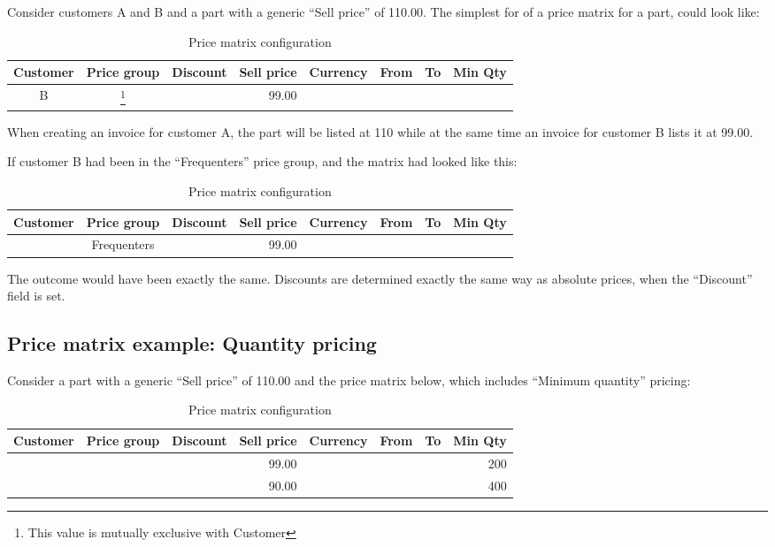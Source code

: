 Consider customers A and B and a part with a generic ``Sell price'' of 110.00.
The simplest for of a price matrix for a part, could look like:

\begin{table}[H]
		\caption{Price matrix configuration}
\begin{tabular}{|ccrrcrrr|}
	\hline
	\bf Customer & \bf Price group & \bf Discount &  \bf Sell price & \bf Currency & \bf From & \bf To & \bf Min Qty \\
	\hline
	B & \footnote{This value is mutually exclusive with Customer} & & 99.00 & & & & \\
	\hline
\end{tabular}
\end{table}

When creating an invoice for customer A, the part will be listed at 110 while at the
same time an invoice for customer B lists it at 99.00.

If customer B had been in the ``Frequenters'' price group, and the matrix had looked like this:

\begin{table}[H]
	\caption{Price matrix configuration}
	\begin{tabular}{|ccrrcrrr|}
		\hline
		\bf Customer & \bf Price group & \bf Discount &  \bf Sell price & \bf Currency & \bf From & \bf To & \bf Min Qty \\
		\hline
		 & Frequenters & & 99.00 & & & & \\
		\hline
	\end{tabular}
\end{table}

The outcome would have been exactly the same. Discounts are determined exactly the same way
as absolute prices, when the ``Discount'' field is set.


\subsection{Price matrix example: Quantity pricing}

Consider a part with a generic ``Sell price'' of 110.00 and the price matrix below, which includes
``Minimum quantity'' pricing:

\begin{table}[H]
	\caption{Price matrix configuration}
	\begin{tabular}{|ccrrcrrr|}
		\hline
		\bf Customer & \bf Price group & \bf Discount &  \bf Sell price & \bf Currency & \bf From & \bf To & \bf Min Qty \\
		\hline
		 & & & 99.00 & & & & 200 \\
		\hline
         & & & 90.00 & & & & 400 \\
		\hline
	\end{tabular}
\end{table}

